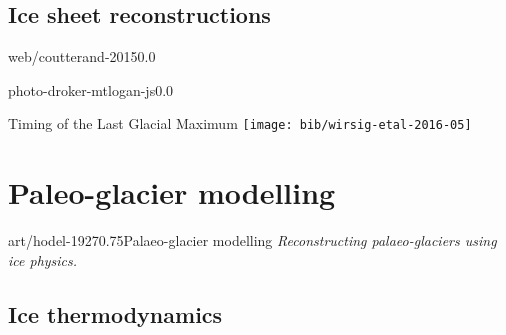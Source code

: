 \documentclass[aspectratio=1610]{beamer}
\begin{document}
\subsection{Ice sheet reconstructions}

    \begin{backgroundframe}[b]{web/coutterand-2015}{0.0}{}
      \flushright{}
    \end{backgroundframe}

    \begin{backgroundframe}[b]{photo-droker-mtlogan-js}{0.0}{}
      \flushleft{}
    \end{backgroundframe}

    \begin{frame}{Timing of the Last Glacial Maximum}
      \texttt{[image: bib/wirsig-etal-2016-05]}
    \end{frame}


\section{Paleo-glacier modelling}

    \begin{sectionframe}{art/hodel-1927}{0.75}{Palaeo-glacier modelling}
      \emph{Reconstructing palaeo-glaciers using ice physics.}
    \end{sectionframe}


\subsection{Ice thermodynamics}
\end{document}
